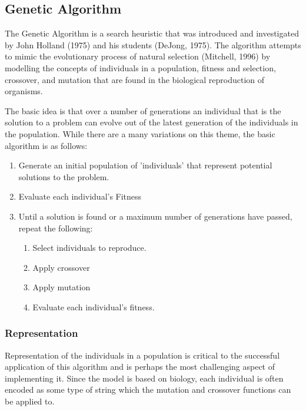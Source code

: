\newcommand{\tab}{\hspace*{2em}}

\subsection{Genetic Algorithm}
 The Genetic Algorithm is a search heuristic that was introduced and investigated by John Holland (1975) 
and his students (DeJong, 1975). The algorithm attempts to mimic the evolutionary process of natural 
selection (Mitchell, 1996) by modelling the concepts of individuals in a population, fitness and selection, 
crossover, and mutation that are found in the biological reproduction of organisms\cite{Mitchell1996}. 

The basic idea is that over a number of generations an individual that is the solution to a problem can 
evolve out of the latest generation of the individuals in the population. While there are a many variations 
on this theme, the basic algorithm is as follows:
\begin{enumerate}
 \item Generate an initial population of 'individuals' that represent potential solutions to the problem.
 \item Evaluate each individual's Fitness
 \item Until a solution is found or a maximum number of generations have passed, repeat the following:
  \begin{enumerate}
   \item Select individuals to reproduce.
   \item Apply crossover
   \item Apply mutation
   \item Evaluate each individual's fitness.
  \end{enumerate}

\end{enumerate}


\subsubsection{Representation}

Representation of the individuals in a population is critical to the successful application of this algorithm and is 
perhaps the most challenging aspect of implementing it. Since the model is based on biology, each individual is often 
encoded as some type of string which the mutation and crossover functions can be applied to. 

